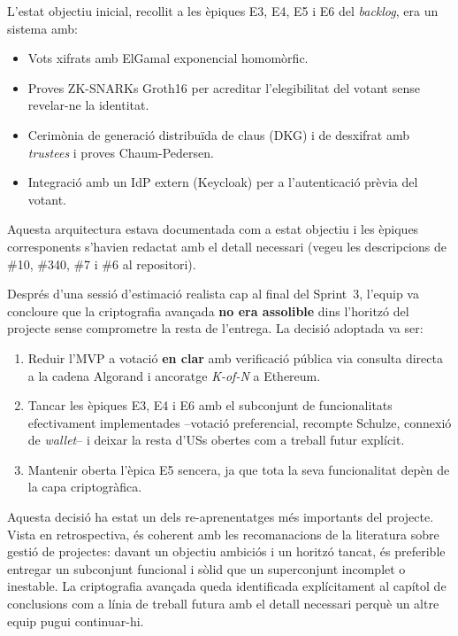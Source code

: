 L'estat objectiu inicial, recollit a les èpiques E3, E4, E5 i E6 del \emph{backlog}, era un sistema amb:

\begin{itemize}
    \item Vots xifrats amb ElGamal exponencial homomòrfic.

    \item Proves \acsp{ZK-SNARK} Groth16 per acreditar l'elegibilitat del votant sense revelar-ne la identitat.

    \item Cerimònia de generació distribuïda de claus (DKG) i de desxifrat amb \emph{trustees} i proves Chaum-Pedersen.

    \item Integració amb un \ac{IdP} extern (Keycloak) per a l'autenticació prèvia del votant.
\end{itemize}

Aquesta arquitectura estava documentada com a estat objectiu i les èpiques corresponents s'havien redactat amb el detall
necessari (vegeu les descripcions de \#10, \#340, \#7 i \#6 al repositori).

Després d'una sessió d'estimació realista cap al final del Sprint~3, l'equip va concloure que la criptografia avançada
\textbf{no era assolible} dins l'horitzó del projecte sense comprometre la resta de l'entrega.
La decisió adoptada va ser:

\begin{enumerate}
    \item Reduir l'\ac{MVP} a votació \textbf{en clar} amb verificació pública via consulta directa a la cadena Algorand
    i ancoratge \textit{K-of-N} a Ethereum.

    \item Tancar les èpiques E3, E4 i E6 amb el subconjunt de funcionalitats efectivament implementades --votació
    preferencial, recompte Schulze, connexió de \emph{wallet}-- i deixar la resta d'\acsp{US} obertes com a treball
    futur explícit.

    \item Mantenir oberta l'èpica E5 sencera, ja que tota la seva funcionalitat depèn de la capa criptogràfica.
\end{enumerate}

Aquesta decisió ha estat un dels re-aprenentatges més importants del projecte.
Vista en retrospectiva, és coherent amb les recomanacions de la literatura sobre gestió de projectes: davant un objectiu
ambiciós i un horitzó tancat, és preferible entregar un subconjunt funcional i sòlid que un superconjunt incomplet o
inestable.
La criptografia avançada queda identificada explícitament al capítol de conclusions com a línia de treball futura amb el
detall necessari perquè un altre equip pugui continuar-hi.

